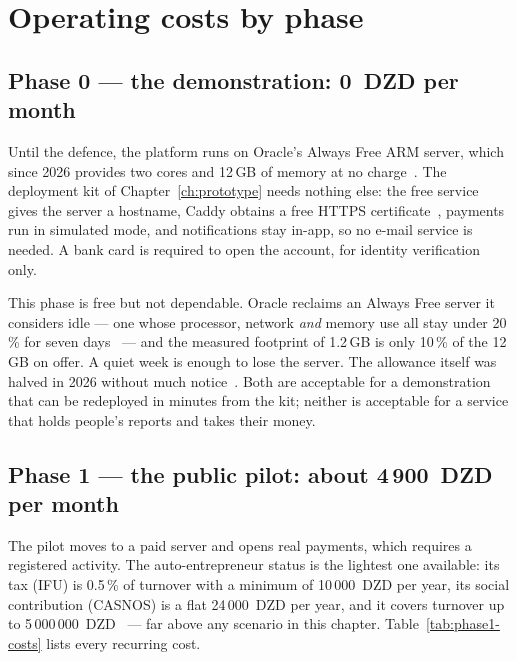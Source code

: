 \section{Operating costs by phase}

\subsection{Phase 0 --- the demonstration: 0~DZD per month}

Until the defence, the platform runs on Oracle's Always Free ARM server, which
since 2026 provides two cores and 12\,GB of memory at no
charge~\cite{terminalbytes2026}. The deployment kit of
Chapter~\ref{ch:prototype} needs nothing else: the free  service
gives the server a hostname, Caddy obtains a free HTTPS
certificate~\cite{caddy2026}, payments run in simulated mode, and notifications
stay in-app, so no e-mail service is needed. A bank card is required to open the
account, for identity verification only.

This phase is free but not dependable. Oracle reclaims an Always Free server it
considers idle --- one whose processor, network \emph{and} memory use all stay
under 20\,\% for seven days~\cite{oraclefree2026} --- and the measured footprint
of 1.2\,GB is only 10\,\% of the 12\,GB on offer. A quiet week is enough to lose
the server. The allowance itself was halved in 2026 without much
notice~\cite{terminalbytes2026}. Both are acceptable for a demonstration that
can be redeployed in minutes from the kit; neither is acceptable for a service
that holds people's reports and takes their money.

\subsection{Phase 1 --- the public pilot: about 4\,900~DZD per month}

The pilot moves to a paid server and opens real payments, which requires a
registered activity. The auto-entrepreneur status is the lightest one available:
its tax (IFU) is 0.5\,\% of turnover with a minimum of 10\,000~DZD per year, its
social contribution (CASNOS) is a flat 24\,000~DZD per year, and it covers
turnover up to 5\,000\,000~DZD~\cite{autoentrepreneur2026} --- far above any
scenario in this chapter. Table~\ref{tab:phase1-costs} lists every recurring
cost.

